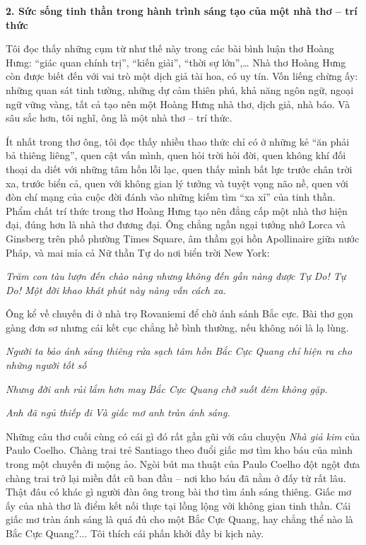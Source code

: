 \documentclass[../main.tex]{subfiles}
\begin{document}
\begin{multicols}{2}
 
\textbf{2. Sức sống tinh thần trong hành trình sáng tạo của một nhà thơ – trí thức } 
 
Tôi đọc thấy những cụm từ như thế này trong các bài bình luận thơ Hoàng Hưng: “giác quan chính trị”, “kiến giải”, “thời sự lớn”,… Nhà thơ Hoàng Hưng còn được biết đến với vai trò một dịch giả tài hoa, có uy tín. Vốn liếng chừng ấy: những quan sát tinh tường, những dự cảm thiên phú, khả năng ngôn ngữ, ngoại ngữ vững vàng, tất cả tạo nên một Hoàng Hưng nhà thơ, dịch giả, nhà báo. Và sâu sắc hơn, tôi nghĩ, ông là một nhà thơ – trí thức.  
 
Ít nhất trong thơ ông, tôi đọc thấy nhiều thao thức chỉ có ở những kẻ “ăn phải bả thiêng liêng”, quen cật vấn mình, quen hỏi trời hỏi đời, quen không khí đối thoại da diết với những tâm hồn lỗi lạc, quen thấy mình bất lực trước chân trời xa, trước biển cả, quen với không gian lý tưởng và tuyệt vọng não nề, quen với đòn chí mạng của cuộc đời đánh vào những kiếm tìm “xa xỉ” của tinh thần. Phẩm chất trí thức trong thơ Hoàng Hưng tạo nên đẳng cấp một nhà thơ hiện đại, đúng hơn là nhà thơ đương đại. Ông chẳng ngần ngại tưởng nhớ Lorca và Ginsberg trên phố phường Times Square, âm thầm gọi hồn Apollinaire giữa nước Pháp, và mai mỉa cả Nữ thần Tự do nơi biển trời New York:         
\begin{blockquote}
        
\textit{Trăm con tàu lượn đến chào nàng nhưng không đến gần nàng được}        
\textit{Tự Do! Tự Do! Một đời khao khát phút này nàng vẫn cách xa. } 

\end{blockquote}
 
Ông kể về chuyến đi ở nhà trọ Rovaniemi để chờ ánh sánh Bắc cực. Bài thơ gọn gàng đơn sơ nhưng cái kết cục chẳng hề bình thường, nếu không nói là lạ lùng.         
\begin{blockquote}
        
\textit{Người ta bảo ánh sáng thiêng rửa sạch tâm hồn} 
\textit{Bắc Cực Quang chỉ hiện ra cho những người tốt số} 
        
\textit{Nhưng đời anh rủi lắm hơn may} 
\textit{Bắc Cực Quang chờ suốt đêm không gặp.} 
        
\textit{Anh đã ngủ thiếp đi } 
\textit{Và giấc mơ anh tràn  ánh sáng. } 

\end{blockquote}
 
Những câu thơ cuối cùng có cái gì đó rất gần gũi với câu chuyện \textit{Nhà giả kim} của  Paulo Coelho. Chàng trai trẻ Santiago theo đuổi giấc mơ tìm kho báu của mình trong một chuyến đi mộng ảo. Ngòi bút ma thuật của Paulo Coelho đột ngột đưa chàng trai trở lại miền đất cũ ban đầu – nơi kho báu đã nằm ở đấy từ rất lâu. Thật đâu có khác gì người đàn ông trong bài thơ tìm ánh sáng thiêng. Giấc mơ ấy của nhà thơ là điểm kết nối thực tại lồng lộng với không gian tinh thần. Cái giấc mơ tràn ánh sáng là quá đủ cho một Bắc Cực Quang, hay chẳng thể nào là Bắc Cực Quang?... Tôi thích cái phấn khởi đầy bi kịch này.  
 

\end{multicols}
\end{document}
